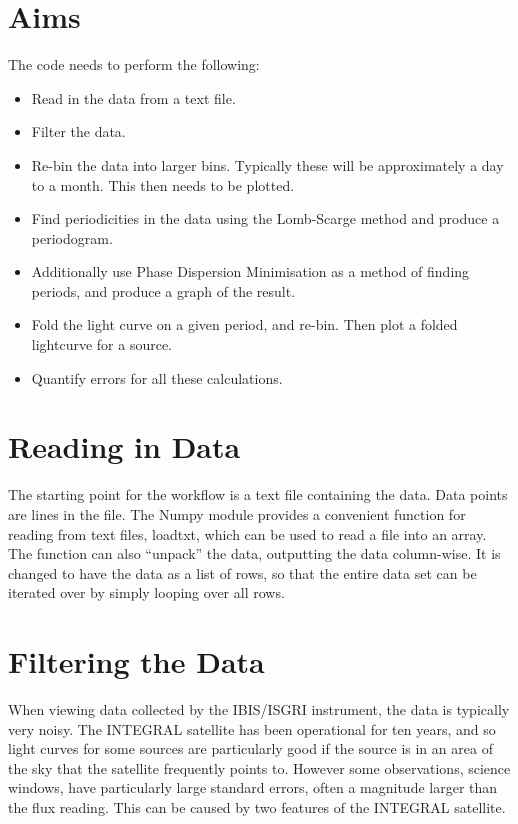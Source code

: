 \section{Aims}
The code needs to perform the following:
\begin{itemize}
\item Read in the data from a text file.
\item Filter the data.
\item Re-bin the data into larger bins. Typically these will be approximately a day to a month. This then needs to be plotted.
\item Find periodicities in the data using the Lomb-Scarge method and produce a periodogram.
\item Additionally use Phase Dispersion Minimisation as a method of finding periods, and produce a graph of the result.
\item Fold the light curve on a given period, and re-bin. Then plot a folded lightcurve for a source.
\item Quantify errors for all these calculations.
\end{itemize}

\section{Reading in Data}
The starting point for the workflow is a text file containing the data. Data points are lines in the file. The Numpy module provides a convenient function for reading from text files, loadtxt, which can be used to read a file into an array. The function can also \textquotedblleft{}unpack\textquotedblright{} the data, outputting the data column-wise.  It is changed to have the data as a list of rows, so that the entire data set can be iterated over by simply looping over all rows.

\section{Filtering the Data}
When viewing data collected by the IBIS/ISGRI instrument, the data is typically very noisy. The INTEGRAL satellite has been operational for ten years, and so light curves for some sources are particularly good if the source is in an area of the sky that the satellite frequently points to. However some observations, science windows, have particularly large standard errors, often a magnitude larger than the flux reading. This can be caused by two features of the INTEGRAL satellite. 

